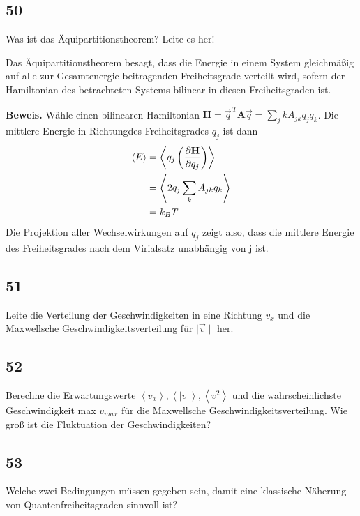 \documentclass[12pt,a4paper]{report}
\newcommand{\betrag}[1]{\ensuremath {\mid #1 \mid}}
\newcommand{\partdd}[2]{\ensuremath {\left(\frac{\partial #1}{\partial #2}}\right)}
\newenvironment{myfrag}{\begin{it}}{\end{it}\vspace{3mm}\par}
\numberwithin{equation}{section}
\begin{document}
\subsection{50}
\begin{myfrag}
Was ist das Äquipartitionstheorem? Leite es her!
\end{myfrag}
Das Äquipartitionstheorem besagt, dass die Energie in einem System gleichmäßig auf alle zur Gesamtenergie beitragenden Freiheitsgrade verteilt wird, sofern der Hamiltonian des betrachteten Systems bilinear in diesen Freiheitsgraden ist.
\par\textbf{Beweis.} Wähle einen bilinearen Hamiltonian $\mathbf{H}=\vec{q}^{\,T}\mathbf{A}\vec{q}=\sum\limits_jk A_{jk}q_jq_k$. Die mittlere Energie \glqq in Richtung\grqq des Freiheitsgrades $q_j$ ist dann 
\begin{align}
	\langle E\rangle&=\left\langle q_j\partdd {\mathbf{H}}{q_j}\right\rangle\\
	&=\left\langle 2q_j\sum\limits_k A_{jk}q_k\right\rangle\\
	&=k_BT\nonumber
\end{align} 
Die Projektion aller Wechselwirkungen auf $q_j$ zeigt also, dass die mittlere Energie des Freiheitsgrades nach dem Virialsatz unabhängig von j ist.
\subsection{51}
\begin{myfrag}
Leite die Verteilung der Geschwindigkeiten in eine Richtung $v_x$ und die
Maxwellsche Geschwindigkeitsverteilung für $\betrag{\vec{v}}$ her.
\end{myfrag}
\subsection{52}
\begin{myfrag}
Berechne die Erwartungswerte $\left\langle v_x \right\rangle , \left\langle |v| \right\rangle , \left\langle v^2 \right\rangle $ und die wahrscheinlichste
Geschwindigkeit max $v_{max}$ für die Maxwellsche Geschwindigkeitsverteilung. Wie
groß ist die Fluktuation der Geschwindigkeiten?
\end{myfrag}
\subsection{53}
\begin{myfrag}
Welche zwei Bedingungen müssen gegeben sein, damit eine klassische
Näherung von Quantenfreiheitsgraden sinnvoll ist?
\end{myfrag}
\end{document}
